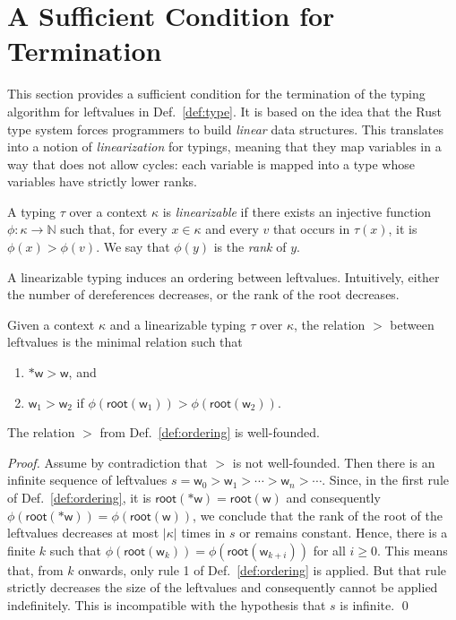 \section{A Sufficient Condition for Termination}\label{sec:termination}

This section provides a sufficient condition for the termination of the
typing algorithm for leftvalues in Def.~\ref{def:type}. It is based on the
idea that the Rust type system forces programmers to build
\emph{linear} data structures. This translates into a notion of
\emph{linearization} for typings, meaning that they map
variables in a way that does not allow cycles: each variable is mapped
into a type whose variables have strictly lower ranks.

\begin{definition}\label{def:linearization}
  A typing $\tau$ over a context $\kappa$ is \emph{linearizable} if there exists
  an injective function $\phi:\kappa\to\mathbb{N}$ such that, for every $x\in\kappa$ and every
  $v$ that occurs in $\tau(x)$, it is $\phi(x)>\phi(v)$. We say that $\phi(y)$ is the \emph{rank} of $y$.
\end{definition}

A linearizable typing induces an ordering between leftvalues. Intuitively, either
the number of dereferences decreases, or the rank of the root decreases.

\begin{definition}\label{def:ordering}
  Given a context $\kappa$ and a linearizable typing $\tau$ over $\kappa$, the
  relation $>$ between leftvalues is the minimal relation such that
  \begin{enumerate}
  \item $\mathtt{*}\mathsf{w}>\mathsf{w}$, and
  \item $\mathsf{w}_1>\mathsf{w}_2$ if $\phi(\mathsf{root}(\mathsf{w}_1))>\phi(\mathsf{root}(\mathsf{w}_2))$.
  \end{enumerate}
\end{definition}

\begin{proposition}\label{prop:well-founded}
  The relation $>$ from Def.~\ref{def:ordering} is well-founded.
\end{proposition}
\begin{proof}
  Assume by contradiction that $>$ is not well-founded. Then there is an infinite sequence of
  leftvalues $s=\mathsf{w}_0>\mathsf{w}_1>\cdots>\mathsf{w}_n>\cdots$.
  Since, in the first rule of Def.~\ref{def:ordering}, it is
  $\mathsf{root}(\mathtt{*}\mathsf{w})=\mathsf{root}(\mathsf{w})$ and consequently
  $\phi(\mathsf{root}(\mathtt{*}\mathsf{w}))=\phi(\mathsf{root}(\mathsf{w}))$,
  we conclude that the rank of the root of the leftvalues
  decreases at most
  $|\kappa|$ times in $s$ or remains constant. Hence, there is a finite $k$ such that
  $\phi(\mathsf{root}(\mathsf{w}_{k}))=\phi(\mathsf{root}(\mathsf{w}_{k+i}))$
  for all $i\ge 0$. This means that, from $k$ onwards, only rule 1 of Def.~\ref{def:ordering}
  is applied. But that rule strictly decreases the size of the leftvalues and consequently cannot
  be applied indefinitely. This is incompatible with the hypothesis that $s$ is infinite.
  \qed
\end{proof}

